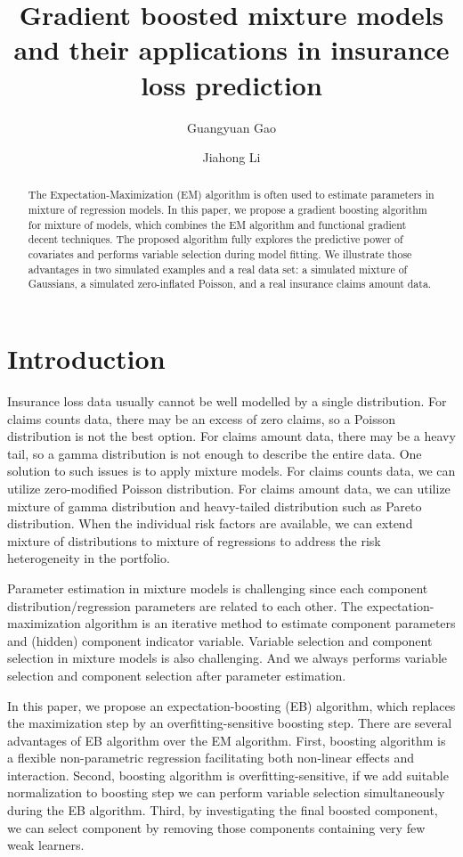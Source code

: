 \documentclass[11pt]{article}
\title{Gradient boosted mixture models and their applications in insurance loss prediction}
\author{Guangyuan Gao \and Jiahong Li}
\numberwithin{equation}{section}
\begin{document}
\maketitle

\begin{abstract}
	The Expectation-Maximization (EM) algorithm is often used to estimate parameters in mixture of regression models. In this paper, we propose a gradient boosting algorithm for mixture of  models, which combines the EM algorithm and functional gradient decent techniques. The proposed algorithm fully explores the predictive power of covariates and performs variable selection during model fitting. We illustrate those advantages in two simulated examples and a real data set: a simulated mixture of Gaussians, a simulated zero-inflated Poisson, and a real insurance claims amount data.   

\end{abstract}

\section{Introduction}

Insurance loss data usually cannot be well modelled by a single distribution.
For claims counts data, there may be an excess of zero claims, so a Poisson distribution is not the best option.
For claims amount data, there may be a heavy tail, so a gamma distribution is not enough to describe the entire data.
One solution to such issues is to apply mixture models.
For claims counts data, we can utilize zero-modified Poisson distribution.
For claims amount data, we can utilize mixture of gamma distribution and heavy-tailed distribution such as Pareto distribution.
When the individual risk factors are available, we can extend mixture of distributions to mixture of regressions to address the risk heterogeneity in the portfolio.

Parameter estimation in mixture models is challenging since each component distribution/regression parameters are related to each other. 
The expectation-maximization algorithm is an iterative method to estimate component parameters and (hidden) component indicator variable.   
Variable selection and component selection in mixture models is also challenging. And we always performs variable selection and component selection after parameter estimation.   

In this paper, we propose an expectation-boosting (EB) algorithm, which replaces the maximization step by an overfitting-sensitive boosting step. 
There are several advantages of EB algorithm over the EM algorithm. First, boosting algorithm is a flexible non-parametric regression facilitating both non-linear effects and interaction. Second, boosting algorithm is overfitting-sensitive, if we add suitable normalization to boosting step we can perform variable selection simultaneously during the EB algorithm. Third, by investigating the final boosted component, we can select component by removing those components containing very few weak learners. 
     
\end{document}
